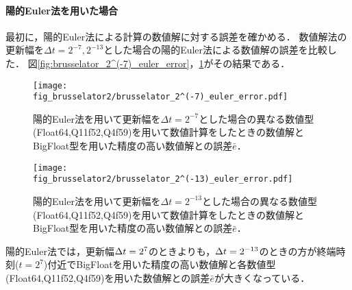 \paragraph*{陽的Euler法を用いた場合}
最初に，陽的Euler法による計算の数値解に対する誤差を確かめる．
数値解法の更新幅を$\Delta t = 2^{-7},2^{-13}$とした場合の陽的Euler法による数値解の誤差を比較した．
図\ref{fig:brusselator_2^(-7)_euler_error}，\ref{fig:brusselator_2^(-13)_euler_error}がその結果である．
\begin{figure}[H]
    \centering
    \begin{minipage}[b]{0.48\columnwidth}
        \centering
        \texttt{[image: fig\_brusselator2/brusselator\_2^(-7)\_euler\_error.pdf]}
        \caption{陽的Euler法を用いて更新幅を$\Delta t = 2^{-7}$とした場合の異なる数値型(Float64,Q11f52,Q4f59)を用いて数値計算をしたときの数値解とBigFloat型を用いた精度の高い数値解との誤差$\bar{e}$．}
        \label{fig:brusselator_2^(-7)_euler_error}
    \end{minipage}
    \hspace{0.01\columnwidth}
    \begin{minipage}[b]{0.48\columnwidth}
        \centering
        \texttt{[image: fig\_brusselator2/brusselator\_2^(-13)\_euler\_error.pdf]}
        \caption{陽的Euler法を用いて更新幅を$\Delta t =  2^{-13}$とした場合の異なる数値型(Float64,Q11f52,Q4f59)を用いて数値計算をしたときの数値解とBigFloat型を用いた精度の高い数値解との誤差$\bar{e}$．}
        \label{fig:brusselator_2^(-13)_euler_error}
    \end{minipage}
\end{figure}
陽的Euler法では，更新幅$\Delta t = 2^{7}$のときよりも，$\Delta t = 2^{-13}$のときの方が終端時刻($t=2^7$)付近でBigFloatを用いた精度の高い数値解と各数値型(Float64,Q11f52,Q4f59)を用いた数値解との誤差$\bar{e}$が大きくなっている．%

